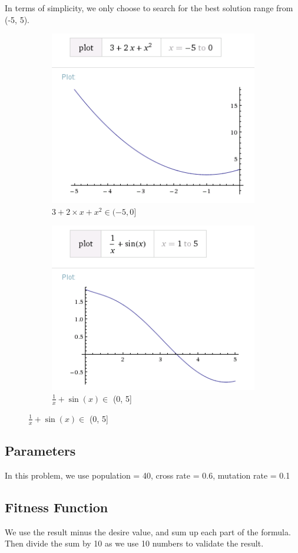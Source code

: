 \documentclass[11pt, a4paper, oneside, openright]{article}
\begin{document}
In terms of simplicity, we only choose to search for the best solution range from (-5, 5).
  \begin{figure}[!ht]
	\centering
	\begin{subfigure}[b]{0.3\textwidth}
		\includegraphics[scale=0.5]{pics/negative.png}
  		\caption{ $3 + 2  \times x + x^2 \in (-5,0]$ }
 		 \label{fig:negative}
	\end{subfigure}
	\begin{subfigure}[b]{0.3\textwidth}
  		\includegraphics[scale=0.5]{pics/positive.png}
 		 \caption{ $\frac{1}{x} + \sin(x) \in $ (0, 5] }
 	 	\label{fig:positve}
	\end{subfigure}
  \end{figure}

\subsection{Parameters}
In this problem, we use population = 40, cross rate = 0.6, mutation rate = 0.1
\subsection{Fitness Function}
We use the result minus the desire value, and sum up each part of the formula. Then divide the sum by 10 as we use 10 numbers to validate the result.
\end{document}
